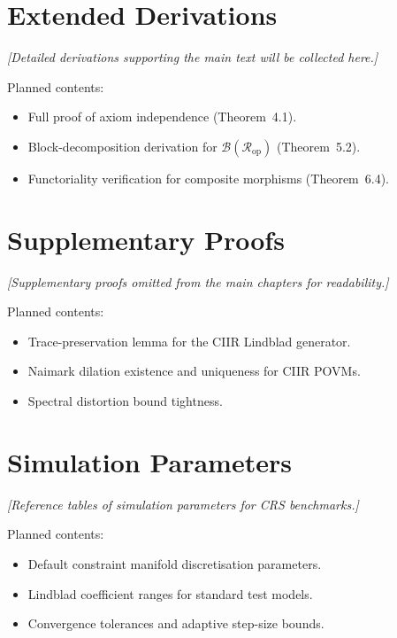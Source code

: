 \documentclass[11pt,a4paper,openany]{book}
\theoremstyle{remark}
\newcommand{\CR}{\mathcal{R}}          %
\newcommand{\CB}{\mathcal{B}}          %
\begin{document}
\chapter{Extended Derivations}
\label{app:derivations}

\begin{center}
\emph{[Detailed derivations supporting the main text will be collected here.]}
\end{center}

\noindent
Planned contents:
\begin{itemize}[nosep]
  \item Full proof of axiom independence (Theorem~4.1).
  \item Block-decomposition derivation for
        $\CB(\CR_{\mathrm{op}})$ (Theorem~5.2).
  \item Functoriality verification for composite morphisms
        (Theorem~6.4).
\end{itemize}

\chapter{Supplementary Proofs}
\label{app:proofs}

\begin{center}
\emph{[Supplementary proofs omitted from the main chapters for readability.]}
\end{center}

\noindent
Planned contents:
\begin{itemize}[nosep]
  \item Trace-preservation lemma for the CIIR Lindblad generator.
  \item Naimark dilation existence and uniqueness for CIIR POVMs.
  \item Spectral distortion bound tightness.
\end{itemize}

\chapter{Simulation Parameters}
\label{app:simulation}

\begin{center}
\emph{[Reference tables of simulation parameters for CRS benchmarks.]}
\end{center}

\noindent
Planned contents:
\begin{itemize}[nosep]
  \item Default constraint manifold discretisation parameters.
  \item Lindblad coefficient ranges for standard test models.
  \item Convergence tolerances and adaptive step-size bounds.
\end{itemize}
\end{document}
